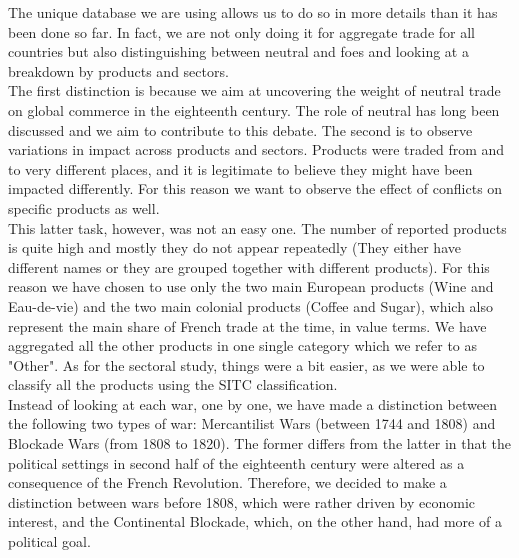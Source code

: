 \documentclass[12pt,a4paper,notitlepage,english]{article}
\begin{document}
\iffalse
The unique database we are using allows us to do so in more details than it has been done so far. In fact, we are not only doing it for aggregate trade for all countries but also distinguishing between neutral and foes and looking at a breakdown by products and sectors. \\
The first distinction is because we aim at uncovering the weight of neutral trade on global commerce in the eighteenth century. The role of neutral has long been discussed and we aim to contribute to this debate. The second is to observe variations in impact across products and sectors. Products were traded from and to very different places, and it is legitimate to believe they might have been impacted differently. For this reason we want to observe the effect of conflicts on specific products as well. \\
This latter task, however, was not an easy one. The number of reported products is quite high and mostly they do not appear repeatedly (They either have different names or they are grouped together with different products). For this reason we have chosen to use only the two main European products (Wine and Eau-de-vie) and the two main colonial products (Coffee and Sugar), which also represent the main share of French trade at the time, in value terms. We have aggregated all the other products in one single category which we refer to as "Other". As for the sectoral study, things were a bit easier, as we were able to classify all the products using the SITC classification. \\
Instead of looking at each war, one by one, we have made a distinction between the following two types of war: Mercantilist Wars (between 1744 and 1808) and Blockade Wars (from 1808 to 1820). The former differs from the latter in that the political settings in second half of the eighteenth century were altered as a consequence of the French Revolution. Therefore, we decided to make a distinction between wars before 1808, which were rather driven by economic interest, and the Continental Blockade, which, on the other hand, had more of a political goal. %
\end{document}

